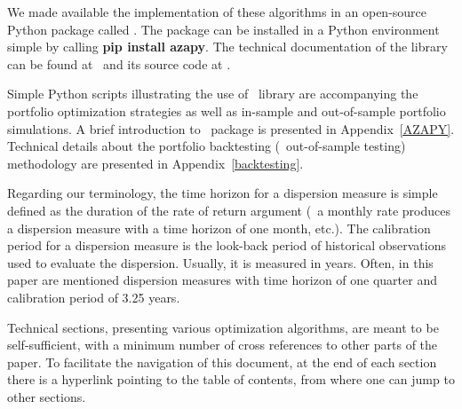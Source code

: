 We made available the implementation of these algorithms in an open-source Python package called \azapy.
The package can be installed in a Python environment simple by calling {\bf pip install azapy}.
The technical documentation of the library can be found at \azapydoc\ and its source code at \azapycode.

Simple Python scripts illustrating the use of \azapy\ library are accompanying the portfolio optimization
strategies as well as in-sample and out-of-sample portfolio simulations.
A brief introduction to \azapy\ package is presented in Appendix~\ref{AZAPY}.
Technical details about the portfolio backtesting (\ie\ out-of-sample testing) methodology are presented in Appendix~\ref{backtesting}.

Regarding our terminology, the time horizon for a dispersion measure is simple defined as the duration of the rate of return argument (\ie\
a monthly rate produces a dispersion measure with a time horizon of one month,
etc.).
The calibration period for a dispersion measure is the look-back period of historical observations used to evaluate the dispersion.
Usually, it is measured in years. Often, in this paper are mentioned dispersion measures with time horizon of one quarter and
calibration period of 3.25 years.

Technical sections, presenting various optimization algorithms, are meant to be self-sufficient, with a minimum number of cross references to other parts of the paper. To facilitate the navigation of this document, at the end of each section there is a hyperlink pointing to the table of contents, from where one can jump to other sections.

\BackToContents



